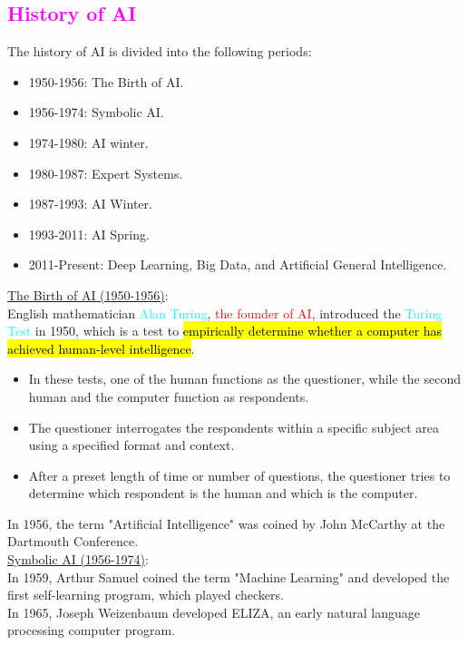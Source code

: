 \documentclass{book}
\begin{document}
\textcolor{magenta}{\section{\textbf{History of AI}}}
The history of AI is divided into the following periods:
\begin{itemize}
    \item 1950-1956: The Birth of AI.
    \item 1956-1974: Symbolic AI.
    \item 1974-1980: AI winter.
    \item 1980-1987: Expert Systems.
    \item 1987-1993: AI Winter.
    \item 1993-2011: AI Spring.
    \item 2011-Present: Deep Learning, Big Data, and Artificial General Intelligence.
\end{itemize}
\raggedright
\uline{The Birth of AI (1950-1956)}: \\
\vspace{1mm}
English mathematician \textcolor{cyan}{Alan Turing}, \textcolor{red}{the founder of AI}, introduced the \textcolor{cyan}{Turing Test} in 1950, which is a test to \hl{empirically determine whether a computer has achieved human-level intelligence}.\\
\begin{itemize}
    \item In these tests, one of the human functions as the questioner, while the second human and the computer function as respondents.
    \item The questioner interrogates the respondents within a specific subject area using a specified format and context.
    \item After a preset length of time or number of questions, the questioner tries to determine which respondent is the human and which is the computer.
\end{itemize}
\vspace{1mm}
In 1956, the term "Artificial Intelligence" was coined by John McCarthy at the Dartmouth Conference.\\
\vspace{1mm}
\uline{Symbolic AI (1956-1974)}: \\
\vspace{1mm}
In 1959, Arthur Samuel coined the term "Machine Learning" and developed the first self-learning program, which played checkers.\\
In 1965, Joseph Weizenbaum developed ELIZA, an early natural language processing computer program.\\
\end{document}
